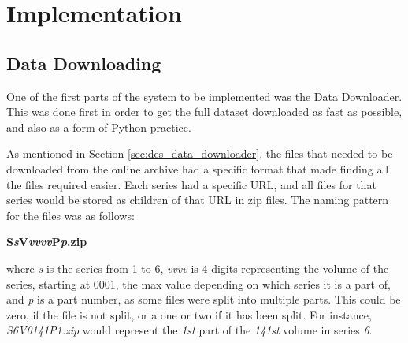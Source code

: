 \chapter{Implementation}

%

	
\section{Data Downloading}
\label{sec:imp_data_download}
One of the first parts of the system to be implemented was the Data Downloader. This was done first in order to get the full dataset downloaded as fast as possible, and also as a form of Python practice.

As mentioned in Section \ref{sec:des_data_downloader}, the files that needed to be downloaded from the online archive had a specific format that made finding all the files required easier. Each series had a specific URL, and all files for that series would be stored as children of that URL in zip files. The naming pattern for the files was as follows:

\textbf{S\emph{s}V\emph{vvvv}P\emph{p}.zip}

where \emph{s} is the series from 1 to 6, \emph{vvvv} is 4 digits representing the volume of the series, starting at 0001, the max value depending on which series it is a part of, and \emph{p} is a part number, as some files were split into multiple parts. This could be zero, if the file is not split, or a one or two if it has been split. For instance, \emph{S6V0141P1.zip} would represent the \emph{1st} part of the \emph{141st} volume in series \emph{6}.

